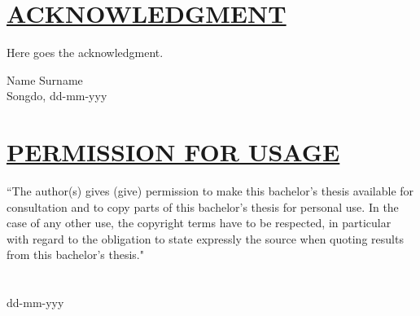 \documentclass[fontsize=13pt]{scrartcl}
\begin{document}
{{{{{{{\section*{\uline{ACKNOWLEDGMENT}}
Here goes the acknowledgment.
\begin{flushright}
Name Surname\\
Songdo, dd-mm-yyy
\end{flushright}
\pagebreak
\clearpage\mbox{}\clearpage
\section*{\uline{PERMISSION FOR USAGE}}
``The author(s) gives (give) permission to make this bachelor's thesis available for consultation and to copy parts of this bachelor's thesis for personal use. In the case of any other use, the copyright terms have to be respected, in particular with regard to the obligation to state expressly the source when quoting results from this bachelor's thesis."\\

\vspace*{1cm}
\\

\vspace*{1cm}
\\

\vspace*{1cm}
 \hspace{2cm} dd-mm-yyy
\pagebreak
\clearpage\mbox{}\clearpage
}}}}}}}
\end{document}
